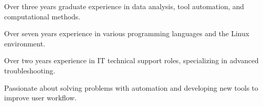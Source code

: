 

\begin{cvparagraph}


\begin{cvitems}

\vspace{3mm}
\item{Over three years graduate experience in data analysis, tool automation, and computational methods.}
\item{Over seven years experience in various programming languages and the Linux environment.}
\item{Over two years experience in IT technical support roles, specializing in advanced troubleshooting.}
\item{Passionate about solving problems with automation and developing new tools to improve user workflow.}
\end{cvitems}
\end{cvparagraph}
